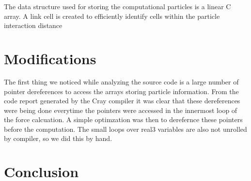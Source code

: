 \documentclass[12pt]{article}
\begin{document}
The data structure used for storing the computational particles is a linear C array.
A link cell is created to efficiently identify cells within the particle interaction distance 




\section{Modifications}
The first thing we noticed while analyzing the source code is a large
number of pointer dereferences to access the arrays storing particle
information. From the code report generated by the Cray compiler it
was clear that these dereferences were being done everytime the
pointers were accessed in the innermost loop of the force
calcuation. A simple optimzation was then to derefernce these pointers
before the computation. The small loops over real3 variables are also
not unrolled by compiler, so we did this by hand.








\section{Conclusion}
\end{document}
